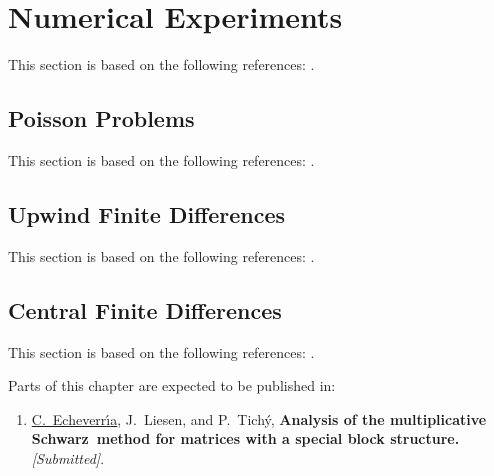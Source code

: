 \section{Numerical Experiments}
This section is based on the following references: \cite{EchLieTic19}.


\subsection{Poisson Problems}
This section is based on the following references: \cite{Smi85}.


\subsection{Upwind Finite Differences}
This section is based on the following references: \cite{EchLieSzyTic18, Smi85}.


\subsection{Central Finite Differences}
This section is based on the following references: \cite{EchLieSzyTic18, Smi85}.



\else

Parts of this chapter are expected to be published in:
\begin{enumerate}
\item[\cite{EchLieTic19}] \underline{C.~Echeverr{\'\i}a}, J.~Liesen, and P.~Tich{\'y}, \textbf{Analysis of the multiplicative Schwarz~method for matrices with a special block structure.}~\textit{ [Submitted]}.
\end{enumerate}


